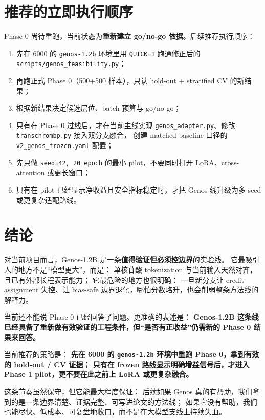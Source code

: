 \documentclass[11pt,a4paper]{ctexart}
\begin{document}
\section{推荐的立即执行顺序}

Phase 0 尚待重跑，当前状态为\textbf{重新建立 go/no-go 依据}。后续推荐执行顺序：

\begin{enumerate}[leftmargin=2em]
  \item 先在 6000 的 \texttt{genos-1.2b} 环境里用 \texttt{QUICK=1} 跑通修正后的 \texttt{scripts/genos\_feasibility.py}；
  \item 再跑正式 Phase 0（500+500 样本），只认 hold-out + stratified CV 的新结果；
  \item 根据新结果决定候选层位、batch 预算与 go/no-go；
  \item 只有在 Phase 0 过线后，才在当前主线实现 \texttt{genos\_adapter.py}、修改 \texttt{transchrombp.py} 接入双分支融合，
  创建 matched baseline 口径的 \texttt{v2\_genos\_frozen.yaml} 配置；
  \item 先只做 \texttt{seed=42, 20 epoch} 的最小 pilot，不要同时打开 LoRA、cross-attention 或更长窗口；
  \item 只有在 pilot 已经显示净收益且安全指标稳定时，才把 Genos 线升级为多 seed 或更复杂适配路线。
\end{enumerate}

\section{结论}

对当前项目而言，Genos-1.2B 是一条\textbf{值得验证但必须控边界}的实验线。
它最吸引人的地方不是“模型更大”，而是：
单核苷酸 tokenization 与当前输入天然对齐，且已有外部长程表示能力；
它最危险的地方也很明确：
一旦新分支让 credit assignment 失控、让 bias-safe 边界退化，哪怕分数略升，也会削弱整条方法线的解释力。

当前还不能说 Phase 0 已经回答了问题。更准确的表述是：
\textbf{Genos-1.2B 这条线已经具备了重新做有效验证的工程条件，但“是否有正收益”仍需新的 Phase 0 结果来回答。}

当前推荐的策略是：
\textbf{先在 6000 的 \texttt{genos-1.2b} 环境中重跑 Phase 0，拿到有效的 hold-out / CV 证据；
只有在 frozen 路线显示明确增益信号后，才进入 Phase 1 pilot，更不要在此之前上 LoRA 或更复杂融合。}

这条节奏虽然保守，但它能最大程度保证：
后续如果 Genos 真的有帮助，我们拿到的是一条边界清楚、证据完整、可写进论文的方法线；
如果它没有帮助，我们也能尽快、低成本、可复盘地收口，而不是在大模型支线上持续失血。
\end{document}
